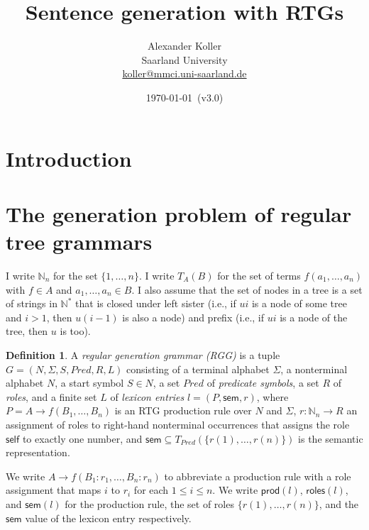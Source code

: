 \documentclass[11pt,a4]{article}
\title{Sentence generation with RTGs}
\author{Alexander Koller \\ Saarland University \\
  \url{koller@mmci.uni-saarland.de}}
\date{\today\ (v3.0)}
\def\N{\mathbb{N}}
\newcommand{\sem}{\mathsf{sem}}
\newcommand{\self}{\mathsf{self}}
\newcommand{\produ}{\mathsf{prod}}
\newcommand{\roles}{\mathsf{roles}}
\newcommand{\Neq}{{:}}
\theoremstyle{plain}
\theoremstyle{definition}
\newtheorem{definition}[theorem]{Definition}
\begin{document}
\maketitle

\section{Introduction}

\section{The generation problem of regular tree grammars}

I write $\N_n$ for the set $\{1,\ldots,n\}$.  I write $T_A(B)$ for the
set of terms $f(a_1,\ldots,a_n)$ with $f \in A$ and $a_1,\ldots,a_n
\in B$.  I also assume that the set of nodes in a tree is a set of
strings in $\N^*$ that is closed under left sister (i.e., if $ui$ is a
node of some tree and $i>1$, then $u(i-1)$ is also a node) and prefix
(i.e., if $ui$ is a node of the tree, then $u$ is too).

\begin{definition}
  A \emph{regular generation grammar (RGG)} is a tuple $G =
  (N,\Sigma,S,Pred,R,L)$ consisting of a terminal alphabet $\Sigma$, a
  nonterminal alphabet $N$, a start symbol $S \in N$, a set $Pred$ of
  \emph{predicate symbols}, a set $R$ of \emph{roles}, and a finite
  set $L$ of \emph{lexicon entries} $l = (P,\sem,r)$, where $P = A
  \rightarrow f(B_1,\ldots,B_n)$ is an RTG production rule over $N$
  and $\Sigma$, $r:\N_n \rightarrow R$ an assignment of roles to
  right-hand nonterminal occurrences that assigns the role $\self$ to
  exactly one number, and $\sem \subseteq
  T_{Pred}(\{r(1),\ldots,r(n)\})$ is the semantic representation.
\end{definition}

We write $A \rightarrow f(B_1\Neq r_1,\ldots,B_n \Neq r_n)$ to
abbreviate a production rule with a role assignment that maps $i$ to
$r_i$ for each $1 \leq i \leq n$. We write $\produ(l)$, $\roles(l)$,
and $\sem(l)$ for the production rule, the set of roles
$\{r(1),\ldots,r(n)\}$, and the $\sem$ value of the lexicon entry
respectively.
\end{document}

